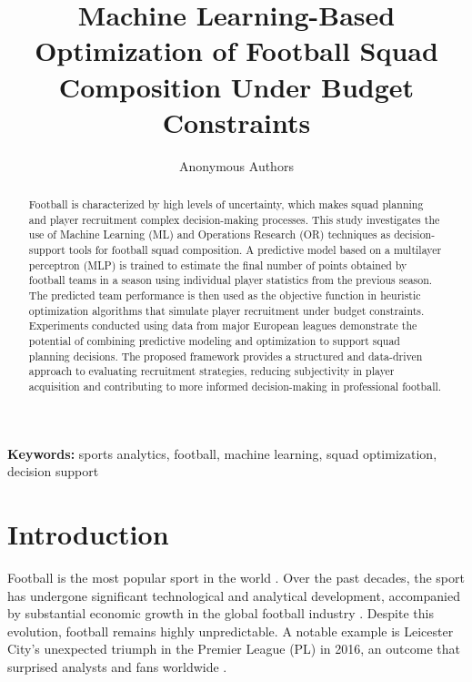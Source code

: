\documentclass[12pt]{article}
\title{Machine Learning-Based Optimization of Football Squad Composition Under Budget Constraints}
\author{Anonymous Authors}
\date{}
\begin{document}
\maketitle


\begin{abstract}

Football is characterized by high levels of uncertainty, which makes squad planning and player recruitment complex decision-making processes. 
This study investigates the use of Machine Learning (ML) and Operations Research (OR) techniques as decision-support tools for football squad composition. 
A predictive model based on a multilayer perceptron (MLP) is trained to estimate the final number of points obtained by football teams in a season using 
individual player statistics from the previous season. 
The predicted team performance is then used as the objective function in heuristic optimization algorithms that simulate player recruitment under budget constraints. 
Experiments conducted using data from major European leagues demonstrate the potential of combining predictive modeling and 
optimization to support squad planning decisions. The proposed framework provides a structured and data-driven approach to evaluating recruitment strategies, 
reducing subjectivity in player acquisition and contributing to more informed decision-making in professional football.

\end{abstract}

\textbf{Keywords:} sports analytics, football, machine learning, squad optimization, decision support

\section{Introduction}

Football is the most popular sport in the world \cite{Almulla2023}. Over the past decades, the sport has undergone significant technological and 
analytical development, accompanied by substantial economic growth in the global football industry \cite{Rodrigues2022}. Despite this evolution, 
football remains highly unpredictable. A notable example is Leicester City's unexpected triumph in the Premier League (PL) in 2016, an outcome 
that surprised analysts and fans worldwide \cite{Baboota2019}.
\end{document}
